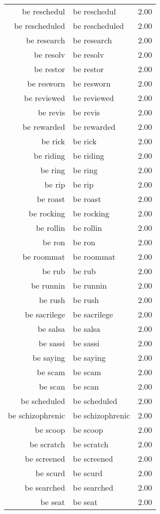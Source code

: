 \begin{table}[ht]
\begin{tabular}{rlr}
  be reschedul & be reschedul & 2.00 \\ 
  be rescheduled & be rescheduled & 2.00 \\ 
  be research & be research & 2.00 \\ 
  be resolv & be resolv & 2.00 \\ 
  be restor & be restor & 2.00 \\ 
  be resworn & be resworn & 2.00 \\ 
  be reviewed & be reviewed & 2.00 \\ 
  be revis & be revis & 2.00 \\ 
  be rewarded & be rewarded & 2.00 \\ 
  be rick & be rick & 2.00 \\ 
  be riding & be riding & 2.00 \\ 
  be ring & be ring & 2.00 \\ 
  be rip & be rip & 2.00 \\ 
  be roast & be roast & 2.00 \\ 
  be rocking & be rocking & 2.00 \\ 
  be rollin & be rollin & 2.00 \\ 
  be ron & be ron & 2.00 \\ 
  be roommat & be roommat & 2.00 \\ 
  be rub & be rub & 2.00 \\ 
  be runnin & be runnin & 2.00 \\ 
  be rush & be rush & 2.00 \\ 
  be sacrilege & be sacrilege & 2.00 \\ 
  be salsa & be salsa & 2.00 \\ 
  be sassi & be sassi & 2.00 \\ 
  be saying & be saying & 2.00 \\ 
  be scam & be scam & 2.00 \\ 
  be scan & be scan & 2.00 \\ 
  be scheduled & be scheduled & 2.00 \\ 
  be schizophrenic & be schizophrenic & 2.00 \\ 
  be scoop & be scoop & 2.00 \\ 
  be scratch & be scratch & 2.00 \\ 
  be screened & be screened & 2.00 \\ 
  be scurd & be scurd & 2.00 \\ 
  be searched & be searched & 2.00 \\ 
  be seat & be seat & 2.00 \\ 

\end{tabular}
\end{table}
